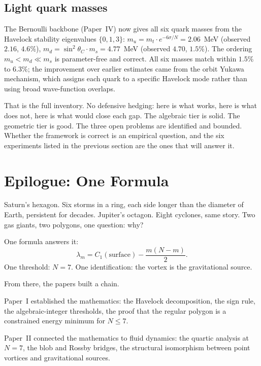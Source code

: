 \subsection*{Light quark masses}

The Bernoulli backbone (Paper~IV) now gives all six quark masses
from the Havelock stability eigenvalues $\{0, 1, 3\}$:
$m_u = m_t \cdot e^{-6\sigma/N} = 2.06$~MeV (observed $2.16$, $4.6\%$),
$m_d = \sin^2\theta_C \cdot m_s = 4.77$~MeV (observed $4.70$, $1.5\%$).
The ordering $m_u < m_d \ll m_s$ is parameter-free and correct.
All six masses match within $1.5\%$ to $6.3\%$;
the improvement over earlier estimates came from the orbit Yukawa
mechanism, which assigns each quark to a specific Havelock mode
rather than using broad wave-function overlaps.

\bigskip

\noindent
That is the full inventory. No defensive hedging: here is what works,
here is what does not, here is what would close each gap. The algebraic
tier is solid. The geometric tier is good. The three open problems are
identified and bounded. Whether the framework is correct is an empirical
question, and the six experiments listed in the previous section are the
ones that will answer it.


\section*{Epilogue: One Formula}

\bigskip

Saturn's hexagon. Six storms in a ring, each side longer than the
diameter of Earth, persistent for decades. Jupiter's octagon. Eight
cyclones, same story. Two gas giants, two polygons, one question: why?

One formula answers it:
\[
  \lambda_m = C_1(\text{surface}) - \frac{m(N - m)}{2}.
\]
One threshold: $N = 7$. One identification: the vortex is the
gravitational source.

From there, the papers built a chain.

Paper~I established the mathematics: the Havelock decomposition, the
sign rule, the algebraic-integer thresholds, the proof that the regular
polygon is a constrained energy minimum for $N \le 7$.

Paper~II connected the mathematics to fluid dynamics: the quartic
analysis at $N = 7$, the blob and Rossby bridges, the structural
isomorphism between point vortices and gravitational sources.

